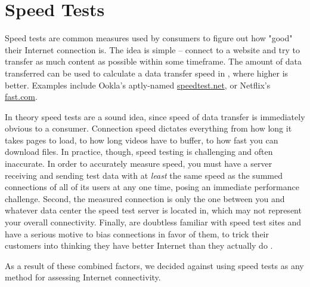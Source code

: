 \section{Speed Tests}\label{sec:speed_test_background}

Speed tests are common measures used by consumers to figure out how "good" their Internet connection is. The idea is simple -- connect to a website and try to transfer as much content as possible within some timeframe. The amount of data transferred can be used to calculate a data transfer speed in \Mbps, where higher is better. Examples include Ookla's aptly-named \url{speedtest.net}, or Netflix's \url{fast.com}.

In theory speed tests are a sound idea, since speed of data transfer is immediately obvious to a consumer. Connection speed dictates everything from how long it takes pages to load, to how long videos have to buffer, to how fast you can download files. In practice, though, speed testing is challenging and often inaccurate. In order to accurately measure speed, you must have a server receiving and sending test data with at \textit{least} the same speed as the summed connections of all of its users at any one time, posing an immediate performance challenge. Second, the measured connection is only the one between you and whatever data center the speed test server is located in, which may not represent your overall connectivity. Finally, \isps are doubtless familiar with speed test sites and have a serious motive to bias connections in favor of them, to trick their customers into thinking they have better Internet than they actually do \cite{SpeedtestComcast2020}.

As a result of these combined factors, we decided against using speed tests as any method for assessing Internet connectivity.
